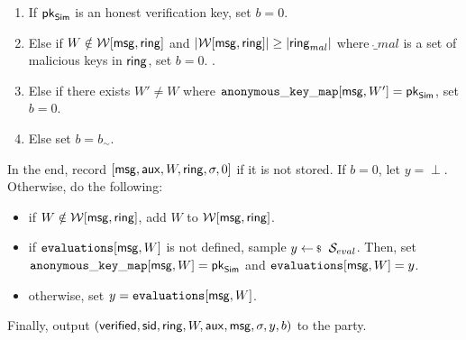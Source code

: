 \begin{tcolorbox}[left=2pt,right=2pt]
\begin{list}{\hspace*{1pt} C}{\setlength\leftmargin{0.15in}}
			\begin{enumerate}
				\item If   $ \mathsf{pk}_{\mathsf{Sim}} $ is an honest verification key, set $ b = 0 $. 
				\label{cond-main:forgery}
				
				\item Else if $ W \notin \mathcal{W}[\mathsf{msg},\mathsf{ring}] $ and $ |\mathcal{W}[\mathsf{msg}, \mathsf{ring}]| \geq |\mathsf{ring}_{mal}| $ where $ \ring_{mal} $ is a set of malicious keys in $ \mathsf{ring} $, set $ b = 0 $.
				\label{cond-main:uniqueness}.
				
				\item Else if there exists $ W' \neq W $ where  $ \mathtt{anonymous\_key\_map}[\mathsf{msg},W'] = \mathsf{pk}_{\mathsf{Sim}} $, set $ b = 0 $. \label{cond-main:differentWforsamepk} 
				\item Else set $ b = b_\sim$. \label{cond-main:simulatorbit}
			\end{enumerate}		
			
		\end{list}
		In the end,  record $ [\mathsf{msg},\mathsf{aux},W,\mathsf{ring},\sigma, 0] $ if it is not stored. If $ b = 0 $, let $y = \perp $. Otherwise,   do the following:
		\begin{itemize}
			\item if $ W \notin \mathcal{W}[\mathsf{msg},\mathsf{ring}] $, add $ W $ to $ \mathcal{W}[\mathsf{msg},\mathsf{ring}]  $.
			\item if $ \texttt{evaluations}[\mathsf{msg},W] $ is not defined, sample $ y \leftsample \setsym{S}_{eval}$. Then, set $ \mathtt{anonymous\_key\_map}[\mathsf{msg},W]  = \mathsf{pk}_{\mathsf{Sim}}$ and $ \texttt{evaluations}[\mathsf{msg}, W] = y$.
			\item otherwise, set $ y = \texttt{evaluations}[\mathsf{msg}, W]$. 	
		\end{itemize}
		Finally, output $(\mathsf{verified}, \textsf{sid}, \mathsf{ring},W, \mathsf{aux},\mathsf{msg}, \sigma, y, b)$ to the party.
		
	\end{tcolorbox}
	

